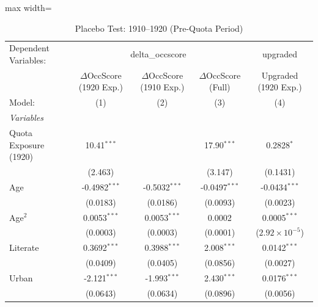 
\begin{table}[htbp]
   \caption{\label{tab:placebo} Placebo Test: 1910--1920 (Pre-Quota Period)}
   \centering
   \begin{adjustbox}{max width=\textwidth}
   \footnotesize
   \begin{tabular}{lcccc}
      \tabularnewline \midrule \midrule
      Dependent Variables: & \multicolumn{3}{c}{delta\_occscore} & upgraded\\
                            & $\Delta$OccScore (1920 Exp.)  & $\Delta$OccScore (1910 Exp.)  & $\Delta$OccScore (Full)  & Upgraded (1920 Exp.) \\   
      Model:                & (1)                           & (2)                           & (3)                      & (4)\\  
      \midrule
      \emph{Variables}\\
      Quota Exposure (1920) & 10.41$^{***}$                 &                               & 17.90$^{***}$            & 0.2828$^{*}$\\   
                            & (2.463)                       &                               & (3.147)                  & (0.1431)\\   
      Age                   & -0.4982$^{***}$               & -0.5032$^{***}$               & -0.0497$^{***}$          & -0.0434$^{***}$\\   
                            & (0.0183)                      & (0.0186)                      & (0.0093)                 & (0.0023)\\   
      Age$^2$               & 0.0053$^{***}$                & 0.0053$^{***}$                & 0.0002                   & 0.0005$^{***}$\\   
                            & (0.0003)                      & (0.0003)                      & (0.0001)                 & ($2.92\times 10^{-5}$)\\    
      Literate              & 0.3692$^{***}$                & 0.3988$^{***}$                & 2.008$^{***}$            & 0.0142$^{***}$\\   
                            & (0.0409)                      & (0.0405)                      & (0.0856)                 & (0.0027)\\   
      Urban                 & -2.121$^{***}$                & -1.993$^{***}$                & 2.430$^{***}$            & 0.0176$^{***}$\\   
                            & (0.0643)                      & (0.0634)                      & (0.0896)                 & (0.0056)\\   

\end{tabular}
\end{adjustbox}
\end{table}
